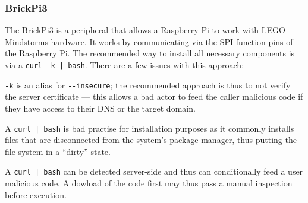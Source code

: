
\subsubsection{BrickPi3}
The BrickPi3 is a peripheral that allows a Raspberry Pi to work with LEGO Mindstorms hardware.
It works by communicating via the SPI function pins of the Raspberry Pi.
The recommended way to install all necessary components is via a \texttt{curl -k | bash}.
There are a few issues with this approach:
\begin{inline-enum}
\item \verb|-k| is an alias for \verb|--insecure|;
  the recommended approach is thus to not verify the server certificate ---
  this allows a bad actor to feed the caller malicious code if they have access to their DNS or the target domain.
\item A \texttt{curl | bash} is bad practise for installation purposes as it commonly installs files that are disconnected from the system's package manager,
  thus putting the file system in a ``dirty'' state.
\item A \texttt{curl | bash} can be detected server-side and thus can conditionally feed a user malicious code.
  A dowload of the code first may thus pass a manual inspection before execution. \parencite{curl-bash}
\end{inline-enum}


